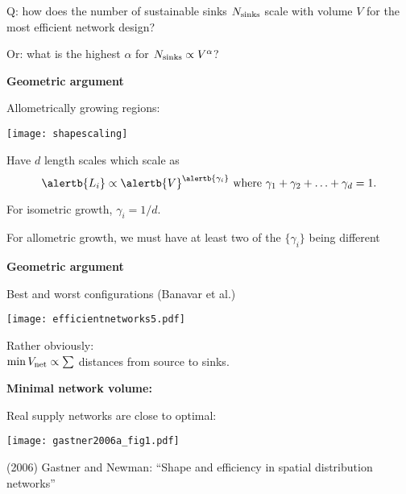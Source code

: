     \alert{Q:} how does the number of sustainable
    sinks $N_{\textnormal{sinks}}$
    scale with volume $V$ for the most efficient network design?
   
    \alert{Or:} what is the highest $\alpha$ for $N_{\textnormal{sinks}} \propto V^{\alpha}$?
  


  \textbf{Geometric argument}

  
   Allometrically growing regions:
  \begin{center}
    \texttt{[image: shapescaling]}    
  \end{center}
  \bigskip
   Have $d$ length scales which scale
    as 
    {
      $$
      \alertb{L_i} \propto \alertb{V}^{\alertb{\gamma_i}}
      \mbox{\ where $\gamma_1 + \gamma_2 + \ldots + \gamma_d = 1$.}
      $$
    }
   
    For \alert{isometric} growth, $\gamma_i = 1/d$.
  
    For \alert{allometric} growth, 
    we must have at least two of the $\{\gamma_i\}$ being different
  



  \textbf{Geometric argument}

  
   Best and worst configurations (Banavar et al.)
    \begin{center}
      \texttt{[image: efficientnetworks5.pdf]}
    \end{center}
    \bigskip
   \alert{Rather obviously:}\\
    $\min V_{\textnormal{net}} \propto \sum$
    distances
    from source to sinks.

  


  \textbf{Minimal network volume:}

  Real supply networks are close to optimal:

  \texttt{[image: gastner2006a\_fig1.pdf]}

  \bigskip

  {\small (2006)
    Gastner and Newman\cite{gastner2006a}:
    ``Shape and efficiency in spatial distribution networks'' }


